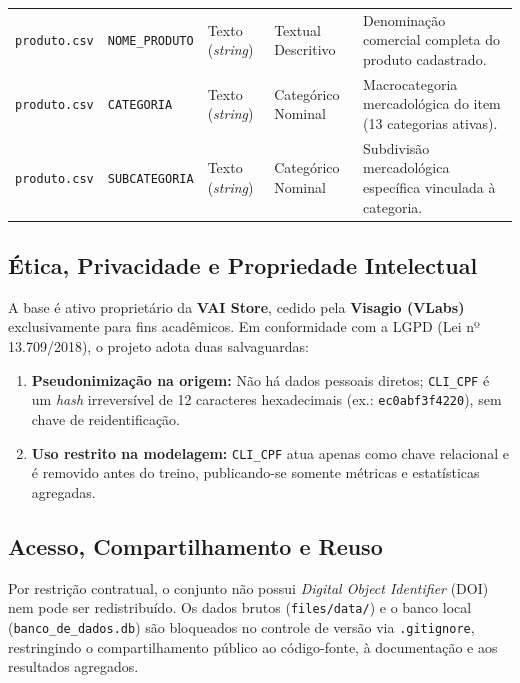 \begin{sloppypar}
\begin{table}[H]
{\begin{tabular}{lllll}
\texttt{produto.csv} & \texttt{NOME\_PRODUTO}& Texto (\textit{string})   & Textual Descritivo      & Denominação comercial completa do produto cadastrado. \\
\texttt{produto.csv} & \texttt{CATEGORIA}    & Texto (\textit{string})   & Categórico Nominal      & Macrocategoria mercadológica do item (13 categorias ativas). \\
\texttt{produto.csv} & \texttt{SUBCATEGORIA} & Texto (\textit{string})   & Categórico Nominal      & Subdivisão mercadológica específica vinculada à categoria. \\
\bottomrule
\end{tabular}%
}
\end{table}
\fi

\subsection{Ética, Privacidade e Propriedade Intelectual}\label{subsec:etica_privacidade}

A base é ativo proprietário da \textbf{VAI Store}, cedido pela \textbf{Visagio (VLabs)} exclusivamente para fins acadêmicos. Em conformidade com a LGPD (Lei nº 13.709/2018), o projeto adota duas salvaguardas:
\begin{enumerate}[leftmargin=*]
    \item \textbf{Pseudonimização na origem:} Não há dados pessoais diretos; \texttt{CLI\_CPF} é um \textit{hash} irreversível de 12 caracteres hexadecimais (ex.: \texttt{ec0abf3f4220}), sem chave de reidentificação.
    \item \textbf{Uso restrito na modelagem:} \texttt{CLI\_CPF} atua apenas como chave relacional e é removido antes do treino, publicando-se somente métricas e estatísticas agregadas.
\end{enumerate}

\subsection{Acesso, Compartilhamento e Reuso}\label{subsec:acesso_compartilhamento}

Por restrição contratual, o conjunto não possui \textit{Digital Object Identifier} (DOI) nem pode ser redistribuído. Os dados brutos (\texttt{files/data/}) e o banco local (\texttt{banco\_de\_dados.db}) são bloqueados no controle de versão via \texttt{.gitignore}, restringindo o compartilhamento público ao código-fonte, à documentação e aos resultados agregados.


\end{sloppypar}
